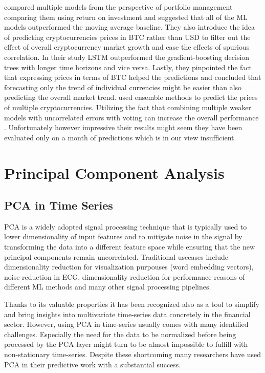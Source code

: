 \cite{Alessandretti2018} compared multiple models from the perspective
of portfolio management comparing them using return on investment and
suggested that all of the \ac{ML} models outperformed the moving average baseline.
They also introduce the idea of predicting cryptocurrencies prices in \ac{BTC} 
rather than USD
to filter out the effect of overall cryptocurrency market growth and ease 
the effects of spurious correlation. In their study \ac{LSTM} outperformed 
the gradient-boosting decision trees with longer time horizons and vice versa.
Lastly, they pinpointed the fact that expressing prices in terms of \ac{BTC}
helped the predictions and concluded that forecasting only the trend of individual 
currencies might be easier than also predicting the overall market trend.
\cite{Chowdhury2020} used ensemble methods to predict the prices of multiple 
cryptocurrencies. Utilizing the fact that combining multiple weaker models
with uncorrelated errors with voting can increase the overall 
performance \cite[see Chapter 14.2]{bishop2006pattern}. 
Unfortunately however impressive their results might seem
they have been evaluated only on a month of predictions which is in our view insufficient.





\section{Principal Component Analysis}
\label{sec:pca}


\subsection{PCA in Time Series}
\ac{PCA} is a widely adopted signal processing technique that is typically
used to lower dimensionality of input features and to mitigate noise in the
signal by transforming the data into a different feature space while ensuring
that the new principal components remain uncorrelated. 
Traditional usecases include dimensionality reduction for visualization purpouses 
(word embedding vectors), noise reduction in ECG, dimensionality reduction for performance reasons
of different \ac{ML} methods and many other signal processing pipelines.


Thanks to its valuable properties it has been recognized also as a tool 
to simplify and bring insights into multivariate time-series data 
concretely in the financial sector. However, using \ac{PCA} in time-series
usually comes with many identified challenges. 
Especially the need for the data to be normalized before being processed by 
the \ac{PCA} layer might turn to be almost impossible to fulfill with
non-stationary time-series. Despite these shortcoming many researchers have 
used \ac{PCA} in their predictive work with a substantial success.


